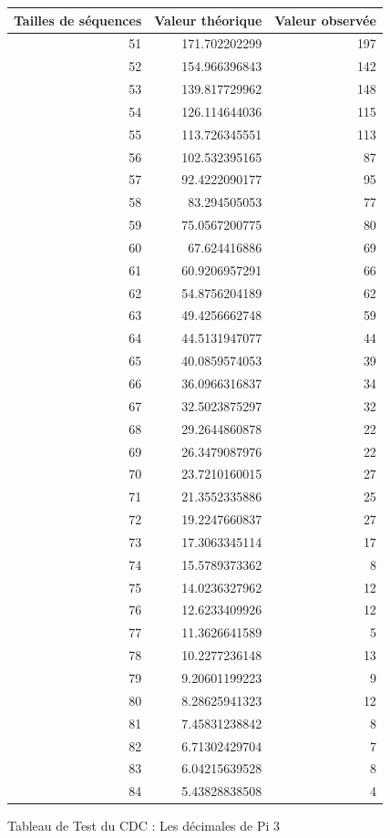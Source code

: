 \documentclass[french]{article}
\begin{document}
\newpage
\begin{figure}[h]
	\centering
	\begin{tabular}{|r|r|r|}
		\hline
		Tailles de séquences & Valeur théorique & Valeur observée\\
		\hline
		51 & 171.702202299 & 197\\
		52 & 154.966396843 & 142\\
		53 & 139.817729962 & 148\\
		54 & 126.114644036 & 115\\
		55 & 113.726345551 & 113\\
		56 & 102.532395165 & 87\\
		57 & 92.4222090177 & 95\\
		58 & 83.294505053 & 77\\
		59 & 75.0567200775 & 80\\
		60 & 67.624416886 & 69\\
		61 & 60.9206957291 & 66\\
		62 & 54.8756204189 & 62\\
		63 & 49.4256662748 & 59\\
		64 & 44.5131947077 & 44\\
		65 & 40.0859574053 & 39\\
		66 & 36.0966316837 & 34\\
		67 & 32.5023875297 & 32\\
		68 & 29.2644860878 & 22\\
		69 & 26.3479087976 & 22\\
		70 & 23.7210160015 & 27\\
		71 & 21.3552335886 & 25\\
		72 & 19.2247660837 & 27\\
		73 & 17.3063345114 & 17\\
		74 & 15.5789373362 & 8\\
		75 & 14.0236327962 & 12\\
		76 & 12.6233409926 & 12\\
		77 & 11.3626641589 & 5\\
		78 & 10.2277236148 & 13\\
		79 & 9.20601199223 & 9\\
		80 & 8.28625941323 & 12\\
		81 & 7.45831238842 & 8\\
		82 & 6.71302429704 & 7\\
		83 & 6.04215639528 & 8\\
		84 & 5.43828838508 & 4\\
		\hline
	\end{tabular}
	\caption{Tableau de Test du CDC : Les décimales de Pi 3}
\end{figure}
\end{document}
